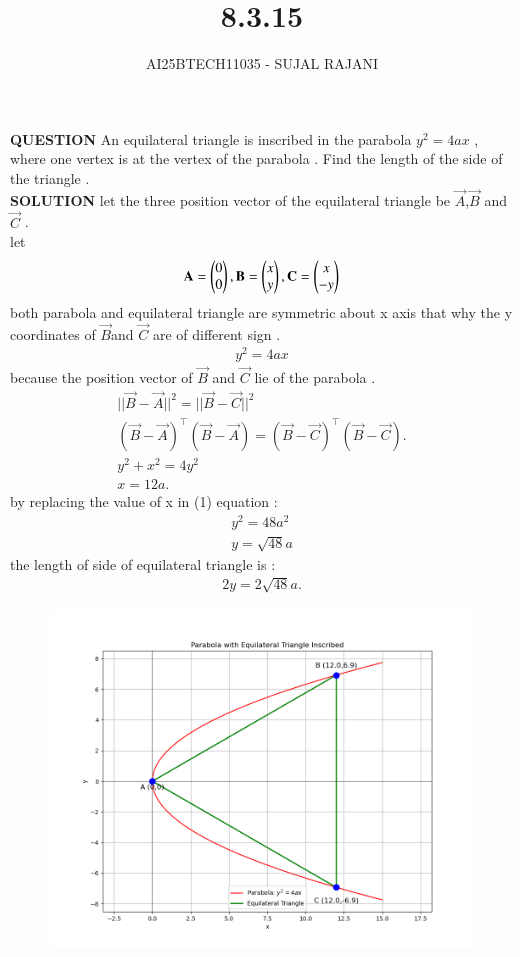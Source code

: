 \documentclass[journal,12pt,onecolumn]{IEEEtran}
\begin{document}
\title{8.3.15}
\author{AI25BTECH11035 - SUJAL RAJANI}
{\let\newpage\relax\maketitle}
\textbf{QUESTION}
An equilateral triangle is inscribed in the parabola $y^2=4ax$
, where one vertex is at the vertex of the parabola . Find the length of the side of the triangle .
\\
\textbf{SOLUTION}
 let the three position vector  of the equilateral triangle be $\vec{A}$,$\vec{B}$ and $\vec{C}$ .
 \\
 let 
 \\
 \begin{align*}
     \mathbf{A}=\begin{pmatrix}0\\0\end{pmatrix}, \mathbf{B}=\begin{pmatrix}x\\y\end{pmatrix}, \mathbf{C}=\begin{pmatrix}x\\-y\end{pmatrix}
 \end{align*}
 both parabola and equilateral triangle are symmetric about x axis  that why the y coordinates of $\vec{B} $and $\vec{C}$ are of different sign .
 \\
  \begin{align*}
      y^2=4ax 
  \end{align*}
  because the position vector of $\vec{B}$ and $\vec{C}$ lie of the parabola .
  \begin{align*}
      ||\vec{B}-\vec{A}||^2=||\vec{B}-\vec{C}||^2
      \\
      (\vec{B}-\vec{A})^\top(\vec{B}-\vec{A})=(\vec{B}-\vec{C})^\top(\vec{B}-\vec{C}) .
      \\
      y^2+x^2=4y^2
      \\
      x=12a.
 \end{align*}
 by replacing the value of x in (1) equation :
\\
\begin{align*}
    y^2=48a^2
    \\
    y=\sqrt{48}a
\end{align*}
the length of side of equilateral triangle is :
\begin{align*}
    2y=2\sqrt{48}a.
\end{align*}
        \begin{figure}[H]
    \centering
    \includegraphics[width = 0.7\columnwidth]{figs/img.png}
    \caption*{}
    \label{figs}
\end{figure}
\end{document}
